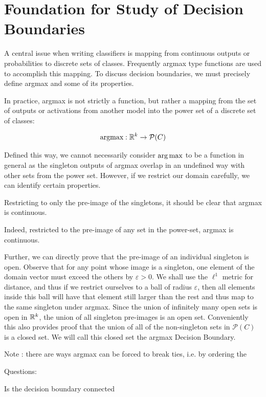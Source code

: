 \section{Foundation for Study of Decision Boundaries} 

A central issue when writing classifiers is mapping from continuous outputs or probabilities to discrete sets of classes. Frequently argmax type functions are used to accomplish this mapping. To discuss decision boundaries, we must precisely define argmax and some of its properties. 

In practice, argmax is not strictly a function, but rather a mapping from the set of outputs or activations from another model into the power set of a discrete set of classes:

\begin{equation}
    \text{argmax} : \mathbb{R}^k \to \mathcal{P}(C)
\end{equation}

Defined this way, we cannot necessarily consider $\operatorname*{arg\,max}$ to be a function in general as the singleton outputs of argmax overlap in an undefined way with other sets from the power set. However, if we restrict our domain carefully, we can identify certain properties. 

Restricting to only the pre-image of the singletons, it should be clear that argmax is continuous. 

Indeed, restricted to the pre-image of any set in the power-set, argmax is continuous. 

Further, we can directly prove that the pre-image of an individual singleton is open. Observe that for any point whose image is a singleton, one element of the domain vector must exceed the others by $\varepsilon > 0$. We shall use the $\ell^1$ metric for distance, and thus if we restrict ourselves to a ball of radius $\varepsilon$, then all elements inside this ball will have that element still larger than the rest and thus map to the same singleton under argmax. Since the union of infinitely many open sets is open in $\mathbb{R}^k$, the union of all singleton pre-images is an open set. Conveniently this also provides proof that the union of all of the non-singleton sets in $\mathcal{P}(C)$ is a closed set. We will call this closed set the argmax Decision Boundary. 

Note : there are ways argmax can be forced to break ties, i.e. by ordering the 

Questions:

Is the decision boundary connected


